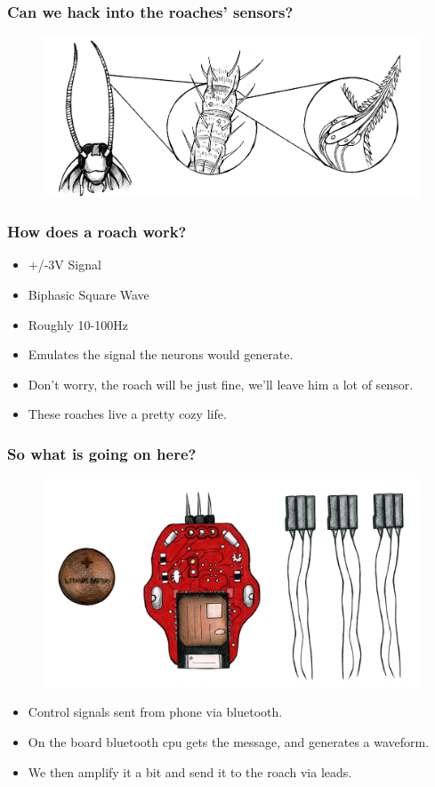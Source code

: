 \documentclass[compress]{beamer}
\begin{document}
\begin{frame}
  \frametitle{Can we hack into the roaches' sensors?}
  \begin{figure}
    \includegraphics[width=0.8\linewidth]{combo2.jpg}
  \end{figure}     
\end{frame}
\begin{frame}
  \frametitle{How does a roach work?}
  \begin{itemize}
    \item +/-3V Signal
    \item Biphasic Square Wave
    \item Roughly 10-100Hz 
    \item Emulates the signal the neurons would generate. 
    \item Don't worry, the roach will be just fine, we'll leave him a lot of sensor.
    \item These roaches live a pretty cozy life. 
    \end{itemize}
\end{frame}
\begin{frame}
  \frametitle{So what is going on here?} 
  \begin{figure}
    \includegraphics[width=0.7\linewidth]{box1.jpg}
  \end{figure}     
  \begin{itemize}
    \item Control signals sent from phone via bluetooth.
    \item On the board bluetooth cpu gets the message, and generates a waveform.
    \item We then amplify it a bit and send it to the roach via leads. 
  \end{itemize}
\end{frame}
\end{document}
